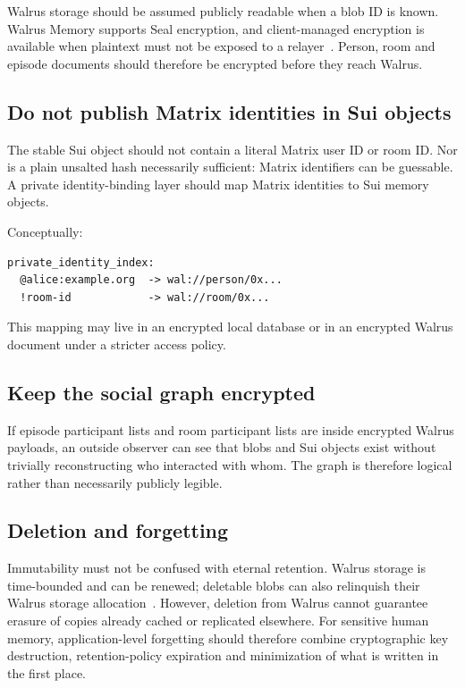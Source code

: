 \documentclass[11pt]{article}
\begin{document}
Walrus storage should be assumed publicly readable when a blob ID is known. Walrus Memory supports Seal encryption, and client-managed encryption is available when plaintext must not be exposed to a relayer~\cite{walrus-agent-loop,walrus-console}. Person, room and episode documents should therefore be encrypted before they reach Walrus.

\subsection{Do not publish Matrix identities in Sui objects}

The stable Sui object should not contain a literal Matrix user ID or room ID. Nor is a plain unsalted hash necessarily sufficient: Matrix identifiers can be guessable. A private identity-binding layer should map Matrix identities to Sui memory objects.

Conceptually:

\begin{lstlisting}
private_identity_index:
  @alice:example.org  -> wal://person/0x...
  !room-id            -> wal://room/0x...
\end{lstlisting}

This mapping may live in an encrypted local database or in an encrypted Walrus document under a stricter access policy.

\subsection{Keep the social graph encrypted}

If episode participant lists and room participant lists are inside encrypted Walrus payloads, an outside observer can see that blobs and Sui objects exist without trivially reconstructing who interacted with whom. The graph is therefore logical rather than necessarily publicly legible.

\subsection{Deletion and forgetting}

Immutability must not be confused with eternal retention. Walrus storage is time-bounded and can be renewed; deletable blobs can also relinquish their Walrus storage allocation~\cite{walrus-whitepaper,walrus-console}. However, deletion from Walrus cannot guarantee erasure of copies already cached or replicated elsewhere. For sensitive human memory, application-level forgetting should therefore combine cryptographic key destruction, retention-policy expiration and minimization of what is written in the first place.
\end{document}
